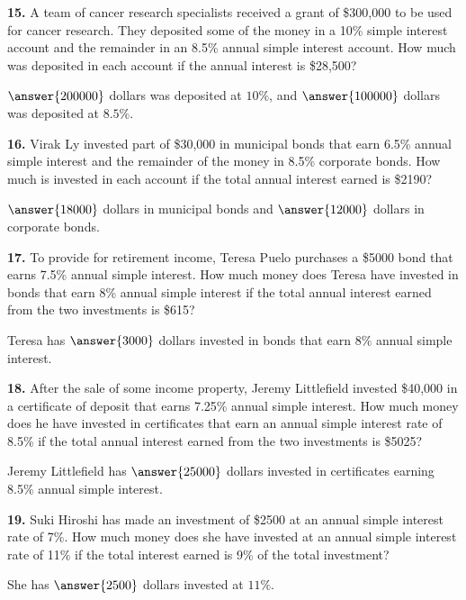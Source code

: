 \documentclass{ximera}
\begin{document}
\begin{problem}
\textbf{15.} A team of cancer research specialists received a grant of \$300,000 to be used for
  cancer research. They deposited some of the money in a 10\% simple interest account and
  the remainder in an 8.5\% annual simple interest account. How much was deposited in each
  account if the annual interest is \$28,500?

\( \answer{200000} \) dollars was deposited at \( 10 \% \), and \( \answer{100000} \) dollars was deposited at \( 8.5 \% \).
\end{problem}

\begin{problem}
\textbf{16.} Virak Ly invested part of \$30,000 in municipal bonds that earn 6.5\% annual
  simple interest and the remainder of the money in 8.5\% corporate bonds. How much is
  invested in each account if the total annual interest earned is \$2190?

\(\answer{18000}\) dollars in municipal bonds and \(\answer{12000}\) dollars in corporate bonds.
\end{problem}

\begin{problem}
\textbf{17.} To provide for retirement income, Teresa Puelo purchases a \$5000 bond that earns
  7.5\% annual simple interest. How much money does Teresa have invested in bonds that
  earn 8\% annual simple interest if the total annual interest earned from the two
  investments is \$615?

Teresa has \( \answer{3000} \) dollars invested in bonds that earn \( 8 \% \) annual simple interest.
\end{problem}

\begin{problem}
\textbf{18.} After the sale of some income property, Jeremy Littlefield invested \$40,000 in a
  certificate of deposit that earns 7.25\% annual simple interest. How much money does he
  have invested in certificates that earn an annual simple interest rate of 8.5\% if the
  total annual interest earned from the two investments is \$5025?

Jeremy Littlefield has \( \answer{25000}\) dollars invested in certificates earning 8.5\% annual simple interest.
\end{problem}

\begin{problem}
\textbf{19.} Suki Hiroshi has made an investment of \$2500 at an annual simple interest rate of
  7\%. How much money does she have invested at an annual simple interest rate of 11\% if
  the total interest earned is 9\% of the total investment?

She has \( \answer{2500} \) dollars invested at \( 11 \% \).
\end{problem}
\end{document}
